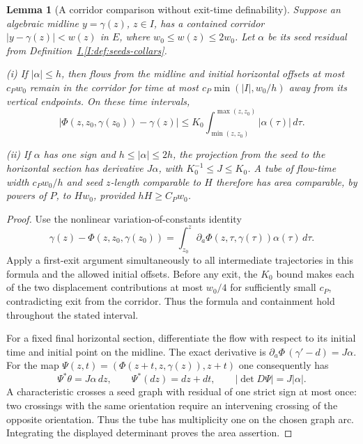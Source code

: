 \documentclass[11pt]{amsart}
\newtheorem{lemma}[theorem]{Lemma}
\theoremstyle{definition}
\theoremstyle{remark}
\numberwithin{equation}{section}
\newcommand{\partIref}[1]{\hyperref[I:#1]{I.\ref*{I:#1}}}
\begin{document}
\begin{lemma}[A corridor comparison without exit-time definability]\label{low:6:og:corridor}
Suppose an algebraic midline $y=\gamma(z)$, $z\in I$, has a contained corridor $|y-\gamma(z)|<w(z)$ in $E$, where $w_0\le w(z)\le2w_0$. Let $\alpha$ be its seed residual from Definition~\partIref{def:seeds-collars}.

\noindent\textup{(i)} If $|\alpha|\le h$, then flows from the midline and initial horizontal offsets at most $c_Pw_0$ remain in the corridor for time at most $c_P\min(|I|,w_0/h)$ away from its vertical endpoints. On these time intervals,
\[
 |\Phi(z,z_0,\gamma(z_0)) -\gamma(z)|\le K_0\int_{\min(z,z_0)}^{\max(z,z_0)}|\alpha(\tau)|\,d\tau.
\]

\noindent\textup{(ii)} If $\alpha$ has one sign and $h\le|\alpha|\le2h$, the projection from the seed to the horizontal section has derivative $J\alpha$, with $K_0^{-1}\le J\le K_0$. A tube of flow-time width $c_Pw_0/h$ and seed $z$-length comparable to $H$ therefore has area comparable, by powers of $P$, to $Hw_0$, provided $hH\ge C_Pw_0$.
\end{lemma}
\begin{proof}
Use the nonlinear variation-of-constants identity
\[
 \gamma(z)-\Phi(z,z_0,\gamma(z_0))=\int_{z_0}^z\partial_a\Phi(z,\tau,\gamma(\tau))\alpha(\tau)\,d\tau.
\]
Apply a first-exit argument simultaneously to all intermediate trajectories in this formula and the allowed initial offsets. Before any exit, the $K_0$ bound makes each of the two displacement contributions at most $w_0/4$ for sufficiently small $c_P$, contradicting exit from the corridor. Thus the formula and containment hold throughout the stated interval.

For a fixed final horizontal section, differentiate the flow with respect to its initial time and initial point on the midline. The exact derivative is $\partial_a\Phi\,(\gamma'-d)=J\alpha$. For the map $\Psi(z,t)=(\Phi(z+t,z,\gamma(z)),z+t)$ one consequently has
\[
 \Psi^*\theta=J\alpha\,dz,\qquad \Psi^*(dz)=dz+dt,\qquad |\det D\Psi|=J|\alpha|.
\]
A characteristic crosses a seed graph with residual of one strict sign at most once: two crossings with the same orientation require an intervening crossing of the opposite orientation. Thus the tube has multiplicity one on the chosen graph arc. Integrating the displayed determinant proves the area assertion.
\end{proof}
\end{document}

